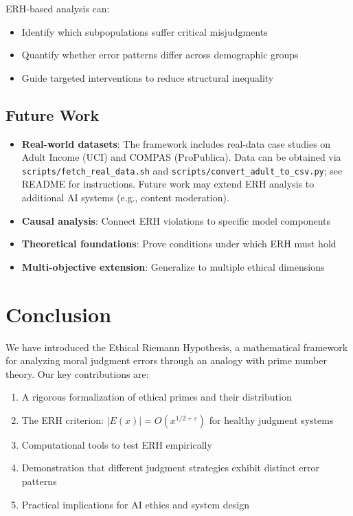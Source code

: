 \documentclass[12pt,a4paper]{article}
\theoremstyle{definition}
\theoremstyle{remark}
\begin{document}
ERH-based analysis can:
\begin{itemize}
    \item Identify which subpopulations suffer critical misjudgments
    \item Quantify whether error patterns differ across demographic groups
    \item Guide targeted interventions to reduce structural inequality
\end{itemize}

\subsection{Future Work}

\begin{itemize}
    \item \textbf{Real-world datasets}: The framework includes real-data case studies on Adult Income (UCI) and COMPAS (ProPublica). Data can be obtained via \texttt{scripts/fetch\_real\_data.sh} and \texttt{scripts/convert\_adult\_to\_csv.py}; see README for instructions. Future work may extend ERH analysis to additional AI systems (e.g., content moderation).
    \item \textbf{Causal analysis}: Connect ERH violations to specific model components
    \item \textbf{Theoretical foundations}: Prove conditions under which ERH must hold
    \item \textbf{Multi-objective extension}: Generalize to multiple ethical dimensions
\end{itemize}

\section{Conclusion}
\label{sec:conclusion}

We have introduced the Ethical Riemann Hypothesis, a mathematical framework for analyzing moral judgment errors through an analogy with prime number theory. Our key contributions are:

\begin{enumerate}
    \item A rigorous formalization of ethical primes and their distribution
    \item The ERH criterion: $|E(x)| = O(x^{1/2+\varepsilon})$ for healthy judgment systems
    \item Computational tools to test ERH empirically
    \item Demonstration that different judgment strategies exhibit distinct error patterns
    \item Practical implications for AI ethics and system design
\end{enumerate}
\end{document}
